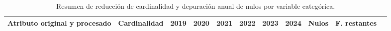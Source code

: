 
\begin{table}[htbp]
\centering
\scriptsize
\setlength{\tabcolsep}{2pt}
\renewcommand{\arraystretch}{1.2}
\caption{Resumen de reducción de cardinalidad y depuración anual de nulos por variable categórica.}
\label{tab:resumen_limpieza_categoricas}
\begin{tabular}{|l|c|c|c|c|c|c|c|c|c|c|}
\hline
\parbox[t]{5.5cm}{\textbf{Atributo original y procesado}} & 
\parbox[t]{1.6cm}{\centering\textbf{Cardinalidad}} & 
\parbox[t]{0.7cm}{\centering\textbf{2019}} & 
\parbox[t]{0.7cm}{\centering\textbf{2020}} & 
\parbox[t]{0.7cm}{\centering\textbf{2021}} & 
\parbox[t]{0.7cm}{\centering\textbf{2022}} & 
\parbox[t]{0.7cm}{\centering\textbf{2023}} & 
\parbox[t]{0.7cm}{\centering\textbf{2024}} & 
\parbox[t]{0.9cm}{\centering\textbf{Nulos}} & 
\parbox[t]{1.5cm}{\centering\textbf{F. restantes}} \\ \hline


\end{tabular}
\end{table}
